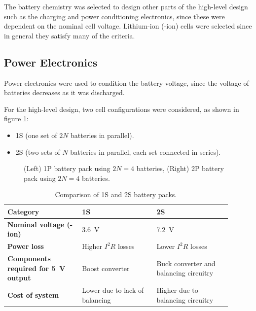 \documentclass{report}
\newcommand{\liion}{\ce{Li}-ion}
\begin{document}
The battery chemistry was selected to design other parts of the high-level design such as the charging and power conditioning electronics, since these were dependent on the nominal cell voltage. Lithium-ion (\liion) cells were selected since in general they satisfy many of the criteria.

\subsection{Power Electronics}
\label{sec:hl-power-electronics}
Power electronics were used to condition the battery voltage, since the voltage of batteries decreases as it was discharged.

For the high-level design, two cell configurations were considered, as shown in figure \ref{fig:1s2s}:
\begin{itemize}
  \item 1S (one set of $2N$ batteries in parallel).
  \item 2S (two sets of $N$ batteries in parallel, each set connected in series).
\end{itemize}

\begin{figure}[H]
  \centering
  
  \caption{(Left) 1P battery pack using $2N=4$ batteries, (Right) 2P battery pack using $2N=4$ batteries.}
  \label{fig:1s2s}
\end{figure}

\begin{table}[H]
  \centering
  \begin{tabular}{|L{0.3\linewidth}|L{0.3\linewidth}|L{0.3\linewidth}|}
    \hline
    \textbf{Category}                                     & \textbf{1S}                    & \textbf{2S}                            \\\hline
    \textbf{Nominal voltage (\liion)}                     & \SI{3.6}{\volt}                & \SI{7.2}{\volt}                        \\\hline
    \textbf{Power loss}                                   & Higher $I^2R$ losses           & Lower $I^2R$ losses                    \\\hline
    \textbf{Components required for \SI{5}{\volt} output} & Boost converter                & Buck converter and balancing circuitry \\\hline
    \textbf{Cost of system}                               & Lower due to lack of balancing & Higher due to balancing circuitry      \\\hline
  \end{tabular}
  \caption{Comparison of 1S and 2S battery packs.}
  \label{tabl:battery-1s2s-comparison}
\end{table}
\end{document}

